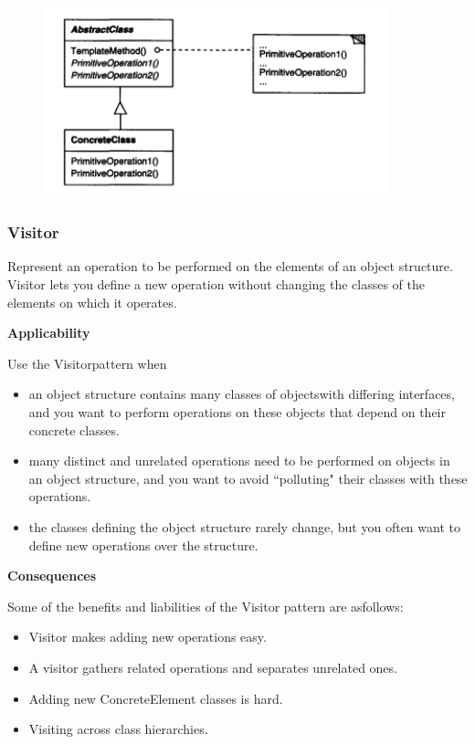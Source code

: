 \documentclass{article}
\begin{document}
\begin{figure}[h]
    \centering
    \includegraphics[width=10cm]{diagrams/pattern-22-template.png}
\end{figure}


\newpage
\subsubsection{Visitor}
Represent an operation to be performed on the elements of an object structure. Visitor lets you define a new operation without changing the classes of the elements on which it operates.

\textbf{Applicability}

Use the Visitorpattern when

\begin{itemize}
    \item an object structure contains many classes of objectswith differing interfaces, and you want to perform operations on these objects that depend on their concrete classes.
    \item  many distinct and unrelated operations need to be performed on objects in an object structure, and you want to avoid ``polluting" their classes with these operations.
    \item the classes defining the object structure rarely change, but you often want to define new operations over the structure.
\end{itemize}

\textbf{Consequences}

Some of the benefits and liabilities of the Visitor pattern are asfollows:
\begin{itemize}
    \item Visitor makes adding new operations easy.
    \item A visitor gathers related operations and separates unrelated ones.
    \item Adding new ConcreteElement classes is hard.
    \item Visiting across class hierarchies.
\end{itemize}
\end{document}
